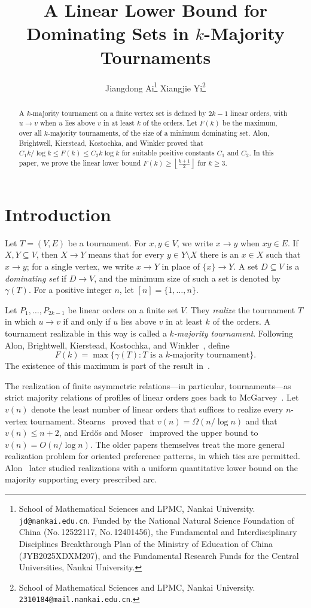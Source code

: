 \documentclass[12pt]{article}
\title{A Linear Lower Bound for Dominating Sets in $k$-Majority Tournaments}
\author{Jiangdong Ai\thanks{School of Mathematical Sciences and LPMC,
    Nankai University. {\tt jd@nankai.edu.cn}.
    Funded by the National Natural Science Foundation of China
    (No.\,12522117, No.\,12401456),
     the Fundamental and Interdisciplinary Disciplines Breakthrough Plan
    of the Ministry of Education of China (JYB2025XDXM207),
    and the Fundamental Research Funds for the Central Universities,
    Nankai University.}
     \hspace{2mm}
     Xiangjie Yi\thanks{School of Mathematical Sciences and LPMC,
    Nankai University. {\tt 2310184@mail.nankai.edu.cn}.}}
\date{}
\theoremstyle{remark}
\begin{document}
\maketitle

\begin{abstract}
A $k$-majority tournament on a finite vertex set is defined by $2k-1$ linear orders, with $u\to v$ when $u$ lies above $v$ in at least $k$ of
the orders.  Let $F(k)$ be the maximum, over all $k$-majority
tournaments, of the size of a minimum dominating set.  Alon,
Brightwell, Kierstead, Kostochka, and Winkler proved that $C_1k/\log k \leq F(k) \leq C_2k\log k$ for suitable positive constants $C_1$ and $C_2$.  In this paper, we prove the linear lower bound $F(k)\ge \left\lfloor\frac{k+1}{2}\right\rfloor $ for $k\ge 3$.

\end{abstract}


\section{Introduction}

Let $T=(V,E)$ be a tournament.  For $x,y\in V$, we write $x\to y$ when
$xy\in E$.  If $X,Y\subseteq V$, then $X\to Y$ means that for every
$y\in Y\setminus X$ there is an $x\in X$ such that $x\to y$; for a single vertex, we write $x\to Y$ in place of $\{x\}\to Y$.  A set
$D\subseteq V$ is a \emph{dominating set} if $D\to V$, and the minimum
size of such a set is denoted by $\gamma(T)$.  For a positive integer
$n$, let $[n]=\{1,\ldots,n\}$.

Let $P_1,\ldots,P_{2k-1}$ be linear orders on a finite set $V$.  They
\emph{realize} the tournament $T$ in which $u\to v$ if and only if $u$
lies above $v$ in at least $k$ of the orders.  A tournament realizable
in this way is called a \emph{$k$-majority tournament}.  Following
Alon, Brightwell, Kierstead, Kostochka, and Winkler~\cite{ABKKW}, define
\[
  F(k)=\max\{\gamma(T):T\text{ is a $k$-majority tournament}\}.
\]
The existence of this maximum is part of the result in~\cite{ABKKW}.

The realization of finite asymmetric relations---in particular, tournaments---as strict majority relations of profiles of linear orders goes back to McGarvey~\cite{McGarvey}.  Let $v(n)$ denote the least number of linear orders that suffices to realize every $n$-vertex
tournament.  Stearns~\cite{Stearns} proved that $v(n)=\Omega(n/\log n)$
and that $v(n)\le n+2$, and Erd\H{o}s and Moser~\cite{ErdosMoser}
improved the upper bound to $v(n)=O(n/\log n)$.  The older papers
themselves treat the more general realization problem for oriented preference patterns, in which ties are permitted.
Alon~\cite{AlonVoting} later studied realizations with a uniform quantitative lower bound on the majority supporting every prescribed arc.
\end{document}
